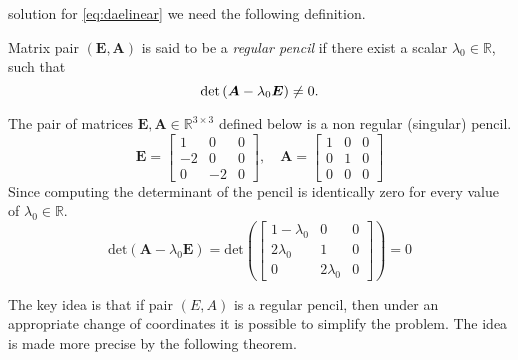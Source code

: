 		solution for \cref{eq:daelinear} we need the following definition.
		\begin{definition}
			Matrix pair $(\bm{E},\bm{A})$ is said to be a \emph{regular pencil}
			if there exist a scalar $\lambda_{0}\in\mathbb{R}$, such that
			\begin{equation}
				\mathrm{det}\left(\bm{A}-\lambda_{0}\bm{E}\right) \neq 0.
			\end{equation}
		\end{definition}
		\begin{example}
			The pair of matrices $\bm{E},\bm{A}\in\mathbb{R}^{3\times 3}$
			defined below is a non regular (singular) pencil.
			\begin{equation}
				\bm{E} = 
				\begin{bmatrix}
					1 	& 0 	& 0 \\
					-2 	& 0 	& 0 \\
					0 	& -2 	& 0 
				\end{bmatrix},
				\quad
				\bm{A} = 
				\begin{bmatrix}
					1 & 0 & 0 \\
					0 & 1 & 0 \\
					0 & 0 & 0
				\end{bmatrix}
			\end{equation}
			Since computing the determinant of the pencil is 
			identically zero for every value of $\lambda_{0}\in\mathbb{R}$.
			\begin{equation}
				\textrm{det}\left(\bm{A}-\lambda_{0}\bm{E}\right) =\textrm{det} 
				\left(
				\begin{bmatrix}
					1-\lambda_{0} 	& 0 			& 0 \\
					2\lambda_{0} 	& 1 			& 0 \\
					0 				& 2\lambda_{0} 	& 0 
				\end{bmatrix}
				\right) = 0 
			\end{equation} 
		\end{example}
		The key idea is that if pair $(E,A)$ is a regular pencil, 
		then under an appropriate change of coordinates it is possible to 
		simplify the problem. The idea is made more precise by the following theorem.
